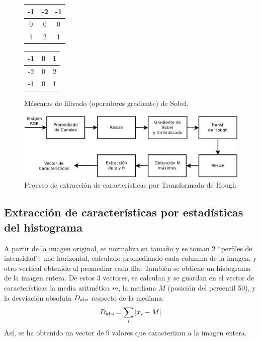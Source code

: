 \documentclass[conference,a4paper,10pt,oneside,final]{tfmpd}
\begin{document}
\begin{figure}
\begin{center}
\begin{tabular}{|c|c|c|}
\hline -1 & -2 & -1 \\\hline 0 & 0 & 0 \\\hline 1 & 2 & 1 \\\hline
\end{tabular}
\begin{tabular}{|c|c|c|}
\hline -1 & 0 & 1 \\\hline -2 & 0 & 2 \\\hline -1 & 0 & 1 \\\hline
\end{tabular}
\end{center}
\caption{Máscaras de filtrado (operadores gradiente) de Sobel.}
\label{masksobel}
\end{figure}
\begin{figure}
\begin{center}
\includegraphics[scale=0.25]{../diagramas/procesohough} 
\end{center}
\caption{Proceso de extracción de características por Transformada de Hough}
\label{procesohough}
\end{figure}
%
%
\subsection{Extracción de características por estadísticas del histograma}
A partir de la imagen original, se normaliza su tamaño y se toman 2 ``perfiles
de intensidad'': uno horizontal, calculado 
promediando %
cada columna de la
imagen, y otro vertical obtenido al promediar cada fila. También se obtiene un
histograma de la imagen entera. De estos 3 vectores, se calculan
y se guardan en el
vector de características la media aritmética $m$, la mediana $M$ (posición del
percentil 50),  y la desviación absoluta $D_{\textrm{abs}}$ respecto de la mediana:
\begin{equation*}
D_{\textrm{abs}}=\sum_i |x_i - M|
\end{equation*}
Así, se ha obtenido un vector de 9 valores que caracterizan %
a la imagen entera.
\end{document}
